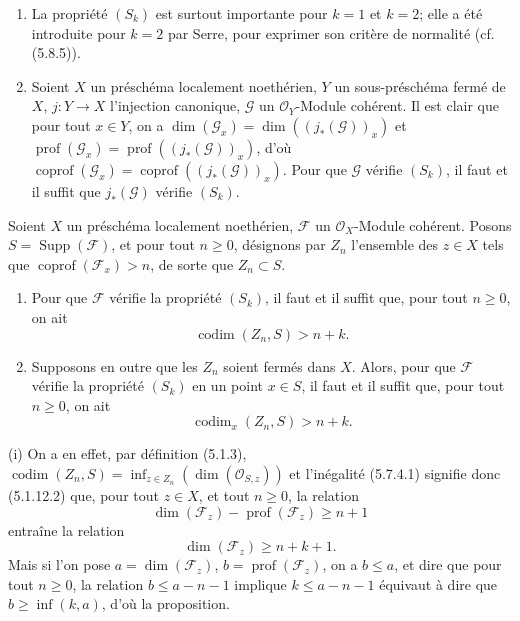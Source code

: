 \begin{remarks}[5.7.3]
\begin{enumerate}
\item[(v)] La propriété $(S_k)$ est surtout importante pour $k=1$ et
$k=2$; elle a été introduite pour $k=2$ par Serre, pour exprimer son critère
de normalité (cf. (5.8.5)).

\item[(vi)] Soient $X$ un préschéma localement noethérien, $Y$ un
sous-préschéma fermé de $X$, $j:Y\to X$ l'injection canonique, $\mathscr G$
un $\mathcal O_Y$-Module cohérent. Il est clair que pour tout $x\in Y$, on a
$\dim(\mathscr G_x)=\dim((j_*(\mathscr G))_x)$ et
$\operatorname{prof}(\mathscr G_x)=\operatorname{prof}((j_*(\mathscr G))_x)$,
d'où
$\operatorname{coprof}(\mathscr G_x)=\operatorname{coprof}((j_*(\mathscr G))_x)$.
Pour que $\mathscr G$ vérifie $(S_k)$, il faut et il suffit que
$j_*(\mathscr G)$ vérifie $(S_k)$.
\end{enumerate}
\end{remarks}

\begin{proposition}[5.7.4]
\label{IV.2.s5.7.4-fr}
Soient $X$ un préschéma localement noethérien, $\mathscr F$ un
$\mathcal O_X$-Module cohérent. Posons $S=\operatorname{Supp}(\mathscr F)$,
et pour tout $n\geq0$, désignons par $Z_n$ l'ensemble des $z\in X$ tels que
$\operatorname{coprof}(\mathscr F_x)>n$, de sorte que $Z_n\subset S$.
\begin{enumerate}
\item[(i)] Pour que $\mathscr F$ vérifie la propriété $(S_k)$, il faut et il
suffit que, pour tout $n\geq0$, on ait
\begin{equation}
\operatorname{codim}(Z_n,S)>n+k.
\tag{5.7.4.1}\label{IV.2.s5.7.4.1-fr}
\end{equation}
\item[(ii)] Supposons en outre que les $Z_n$ soient fermés dans $X$. Alors,
pour que $\mathscr F$ vérifie la propriété $(S_k)$ en un point $x\in S$, il
faut et il suffit que, pour tout $n\geq0$, on ait
\begin{equation}
\operatorname{codim}_x(Z_n,S)>n+k.
\tag{5.7.4.2}\label{IV.2.s5.7.4.2-fr}
\end{equation}
\end{enumerate}
\end{proposition}

(i) On a en effet, par définition (5.1.3),
$\operatorname{codim}(Z_n,S)=\inf_{z\in Z_n}(\dim(\mathcal O_{S,z}))$ et
l'inégalité (5.7.4.1) signifie donc (5.1.12.2) que, pour tout $z\in X$, et
tout $n\geq0$, la relation
\[
\dim(\mathscr F_z)-\operatorname{prof}(\mathscr F_z)\geq n+1
\]
entraîne la relation
\[
\dim(\mathscr F_z)\geq n+k+1.
\]
Mais si l'on pose $a=\dim(\mathscr F_z)$,
$b=\operatorname{prof}(\mathscr F_z)$, on a $b\leq a$, et dire que pour tout
$n\geq0$, la relation $b\leq a-n-1$ implique $k\leq a-n-1$ équivaut à dire
que $b\geq\inf(k,a)$, d'où la proposition.

